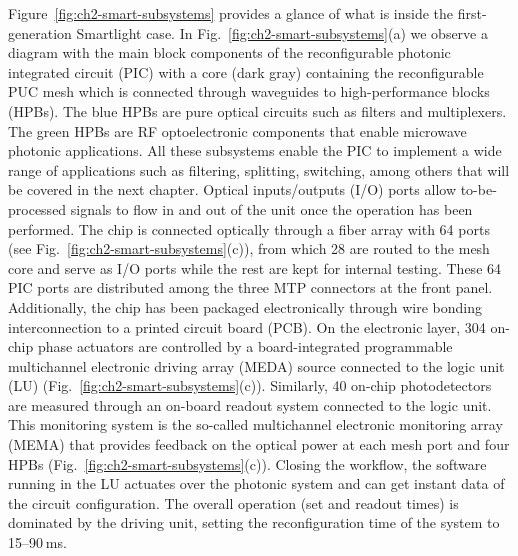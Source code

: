 Figure~\ref{fig:ch2-smart-subsystems} provides a glance of what is inside the first-generation Smartlight case.
In Fig.~\ref{fig:ch2-smart-subsystems}(a) we observe a diagram with the main block components of the reconfigurable photonic integrated circuit (PIC) with a core (dark gray) containing the reconfigurable PUC mesh which is connected through waveguides to high-performance blocks (HPBs).
The blue HPBs are pure optical circuits such as filters and multiplexers.
The green HPBs are RF optoelectronic components that enable microwave photonic applications.
All these subsystems enable the PIC to implement a wide range of applications such as filtering, splitting, switching, among others that will be covered in the next chapter.
Optical inputs/outputs (I/O) ports allow to-be-processed signals to flow in and out of the unit once the operation has been performed.
The chip is connected optically through a fiber array with 64 ports (see Fig.~\ref{fig:ch2-smart-subsystems}(c)), from which 28 are routed to the mesh core and serve as I/O ports while the rest are kept for internal testing.
These 64 PIC ports are distributed among the three MTP connectors at the front panel.
Additionally, the chip has been packaged electronically through wire bonding interconnection to a printed circuit board (PCB).
On the electronic layer, 304 on-chip phase actuators are controlled by a board-integrated programmable multichannel electronic driving array (MEDA) source connected to the logic unit (LU) (Fig.~\ref{fig:ch2-smart-subsystems}(c)).
Similarly, 40 on-chip photodetectors are measured through an on-board readout system connected to the logic unit.
This monitoring system is the so-called multichannel electronic monitoring array (MEMA) that provides feedback on the optical power at each mesh port and four HPBs (Fig.~\ref{fig:ch2-smart-subsystems}(c)).
Closing the workflow, the software running in the LU actuates over the photonic system and can get instant data of the circuit configuration.
The overall operation (set and readout times) is dominated by the driving unit, setting the reconfiguration time of the system to 15–90 ms.

